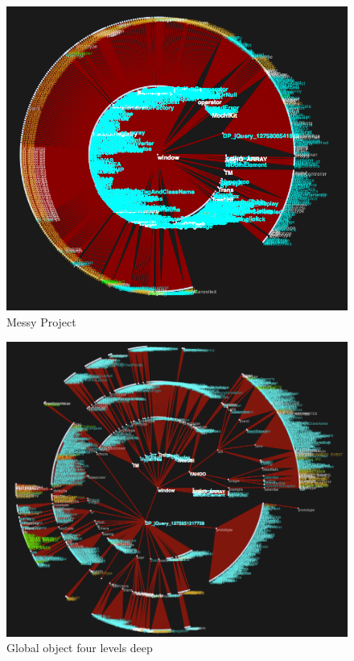 \documentclass[]{article}
\begin{document}
\begin{figure}[h]
  \begin{center}
    \includegraphics[scale=.25]{messy.png}
  \end{center}
  \caption{Messy Project}
  \label{fig:messy}
\end{figure}

\begin{figure}[h]
  \begin{center}
    \includegraphics[scale=.2]{deep-window.png}
  \end{center}
  \caption{Global object four levels deep}
  \label{fig:deep-window}
\end{figure}
\end{document}
